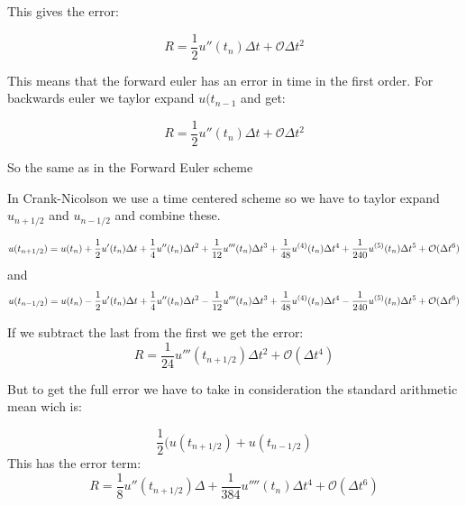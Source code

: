 \documentclass[a4paper,10pt]{article}
\begin{document}
This gives the error:

\begin{equation}
 R = \frac{1}{2}u''(t_n)\Delta t + \mathcal{O}\Delta t^2
\end{equation}

This means that the forward euler has an error in time in the first order. 
For backwards euler we taylor expand $u(t_{n-1}$ and get:

\begin{equation}
  R = \frac{1}{2}u''(t_n)\Delta t + \mathcal{O}\Delta t^2
\end{equation}

So the same as in the Forward Euler scheme

In Crank-Nicolson we use a time centered scheme so we have to taylor expand $u_{n+ 1/2}$ and $u_{n-1/2}$ and combine these. 

\begin{equation}
u(t_{n+1/2}) = u(t_n) + \frac{1}{2} u'(t_n)\Delta t + \frac{1}{4} u''(t_n) \Delta t^2 + \\
\frac{1}{12}u'''(t_n) \Delta t^3 + \frac{1}{48} u^{(4)}(t_n)\Delta t^4 + \\
\frac{1}{240} u^{(5)} (t_n) \Delta t^5 + \mathcal{O}(\Delta t^6)
\end{equation}
and
\begin{equation}
 u(t_{n-1/2}) = u(t_n) - \frac{1}{2} u'(t_n)\Delta t + \frac{1}{4} u''(t_n) \Delta t^2 - \\
\frac{1}{12}u'''(t_n) \Delta t^3 + \frac{1}{48} u^{(4)}(t_n)\Delta t^4 - \\
\frac{1}{240} u^{(5)} (t_n) \Delta t^5 + \mathcal{O}(\Delta t^6)
\end{equation}

If we subtract the last from the first we get the error:
\begin{equation}
 R = \frac{1}{24}u'''(t_{n+1/2})\Delta t^2 + \mathcal{O}(\Delta t^4)
\end{equation}

But to get the full error we have to take in consideration the standard arithmetic mean wich is:

\begin{equation}
 \frac{1}{2}(u(t_{n+1/2}) + u(t_{n - 1/2}) 
\end{equation}
This has the error term:
\begin{equation}
 R = \frac{1}{8}u''(t_{n+1/2})\Delta + \frac{1}{384}u''''(t_n)\Delta t^4 + \mathcal{O}(\Delta t^6)
\end{equation}
\end{document}
